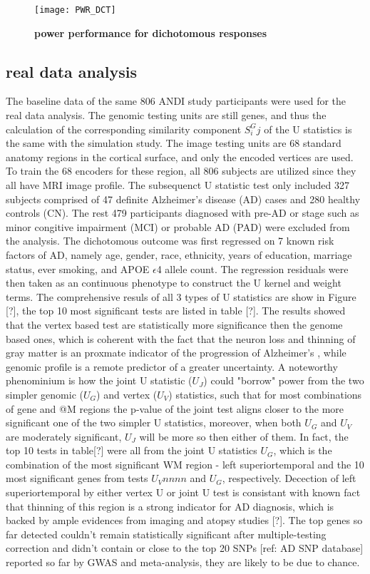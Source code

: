 \begin{figure}[h]
\centering
\texttt{[image: PWR\_DCT]}
\caption{\textbf{power performance for dichotomous responses}}
\label{fig:PWR_DCT}
\end{figure}

\subsection{real data analysis}
The baseline data of the same 806 ANDI study participants were used for the real data analysis. The genomic testing units are still genes, and thus the calculation of the corresponding similarity component $S^G_ij$ of the U statistics is the same with the simulation study. The image testing units are 68 standard anatomy regions in the cortical surface, and only the encoded vertices are used. To train the 68 encoders for these region, all 806 subjects are utilized since they all have MRI image profile. The subsequenct U statistic test only included 327 subjects comprised of 47 definite Alzheimer's disease (AD) cases and 280 healthy controls (CN). The rest 479 participants diagnosed with pre-AD or stage such as minor congitive impairment (MCI) or probable AD (PAD) were excluded from the analysis. The dichotomous outcome was first regressed on 7 known risk factors of AD, namely age, gender, race, ethnicity, years of education, marriage status, ever smoking, and APOE $\epsilon$4 allele count. The regression residuals were then taken as an continuous phenotype to construct the U kernel and weight terms. The comprehensive resuls of all 3 types of U statistics are show in Figure [?], the top 10 most significant tests are listed in table [?]. 
The results showed that the vertex based test are statistically more significance then the genome based ones, which is coherent with the fact that the neuron loss and thinning of gray matter is an proxmate indicator of the progression of Alzheimer's , while genomic profile is a remote predictor of a greater uncertainty. A noteworthy phenominium is how the joint U statistic ($U_J$) could "borrow" power from the two simpler genomic ($U_G$) and vertex ($U_V$) statistics, such that for most combinations of gene and @M regions the p-value of the joint test aligns closer to the more significant one of the two simpler U statistics, moreover, when both $U_G$ and $U_V$ are moderately significant, $U_J$ will be more so then either of them. In fact, the top 10 tests in table[?] were all from the joint U statistics $U_G$, which is the combination of the most significant WM region - left superiortemporal and the 10 most significant genes from tests $U_Vnnnn$ and $U_G$, respectively. Decection of left superiortemporal by either vertex U or joint U test is consistant with known fact that thinning of this region is a strong indicator for AD diagnosis, which is backed by ample evidences from imaging and atopsy studies [?]. The top genes so far detected couldn't remain statistically significant after multiple-testing correction and didn't contain or close to the top 20 SNPs [ref: AD SNP database] reported so far by GWAS and meta-analysis, they are likely to be due to chance. 



